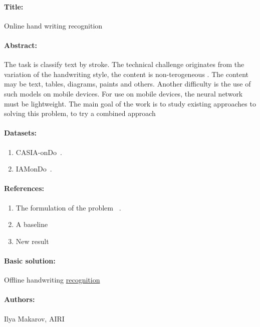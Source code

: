 \documentclass[12pt]{article}
\begin{document}
\paragraph{Title:} Online hand writing recognition

\paragraph{Abstract:} The task is classify text by stroke. The technical challenge originates from the variation of the handwriting style, the content is non-terogeneous 
. The content may be text, tables, diagrams, paints and others. Another difficulty is the use of such models on mobile devices. For use on mobile devices, the neural network must be lightweight.
The main goal of the work is to study existing approaches to solving this problem, to try a combined approach


\paragraph{Datasets:} 
\begin{enumerate}
\item CASIA-onDo~\cite{inbook}.
\item IAMonDo~\cite{inproceedings}.
\end{enumerate}

\paragraph{References:}
\begin{enumerate}
\item The formulation of the problem ~\cite{article}.
\item A baseline ~\cite{NIPS2008_66368270}
\item New result ~\cite{8978003}
\end{enumerate}

\paragraph{Basic solution:} Offline handwriting \href{https://github.com/suhaspillai/HandwritingRecognition-with-MultiDimensionalRecurrentNeuralNetworks}{recognition}

\paragraph{Authors:} Ilya Makarov, AIRI




\end{document}
